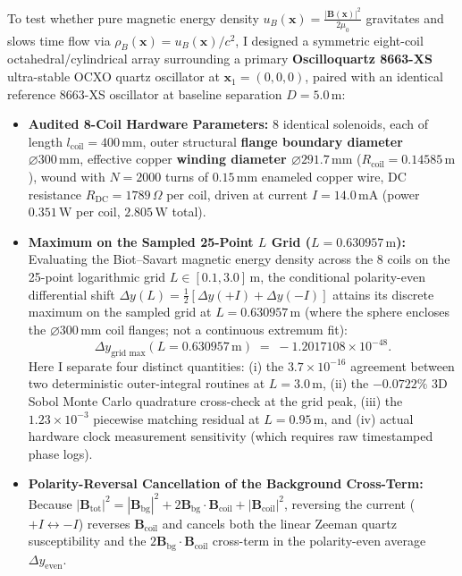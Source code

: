 \documentclass[10pt,a4paper]{article}
\begin{document}
\par
To test whether pure magnetic energy density $u_B(\mathbf{x}) = \frac{|\mathbf{B}(\mathbf{x})|^2}{2\mu_0}$ gravitates and slows time flow via $\rho_B(\mathbf{x}) = u_B(\mathbf{x})/c^2$, I designed a symmetric eight-coil octahedral/cylindrical array surrounding a primary \textbf{Oscilloquartz 8663-XS} ultra-stable OCXO quartz oscillator at $\mathbf{x}_1 = (0,0,0)$, paired with an identical reference 8663-XS oscillator at baseline separation $D = 5.0\,\text{m}$:
\begin{itemize}\setlength{\itemsep}{1pt}\setlength{\parskip}{0pt}\setlength{\topsep}{1pt}
  \item \textbf{Audited 8-Coil Hardware Parameters:} 8 identical solenoids, each of length $l_{\text{coil}} = 400\,\text{mm}$, outer structural \textbf{flange boundary diameter $\varnothing 300\,\text{mm}$}, effective copper \textbf{winding diameter $\varnothing 291.7\,\text{mm}$} ($R_{\text{coil}} = 0.14585\,\text{m}$), wound with $N = 2000$ turns of $0.15\,\text{mm}$ enameled copper wire, DC resistance $R_{\text{DC}} = 1789\,\Omega$ per coil, driven at current $I = 14.0\,\text{mA}$ (power $0.351\,\text{W}$ per coil, $2.805\,\text{W}$ total).
  \item \textbf{Maximum on the Sampled 25-Point $L$ Grid ($L = 0.630957\,\text{m}$):} Evaluating the Biot--Savart magnetic energy density across the 8 coils on the 25-point logarithmic grid $L \in [0.1, 3.0]\,\text{m}$, the conditional polarity-even differential shift $\Delta y(L) = \frac{1}{2}[\Delta y(+I) + \Delta y(-I)]$ attains its discrete maximum on the sampled grid at \textbf{$L = 0.630957\,\text{m}$} (where the sphere encloses the $\varnothing 300\,\text{mm}$ coil flanges; not a continuous extremum fit):
  \begin{equation}
    \Delta y_{\text{grid max}}(L = 0.630957\,\text{m}) \;=\; -1.2017108\times 10^{-48}.
  \end{equation}
  Here I separate four distinct quantities: (i) the $3.7\times 10^{-16}$ agreement between two deterministic outer-integral routines at $L=3.0\,\text{m}$, (ii) the $-0.0722\%$ 3D Sobol Monte Carlo quadrature cross-check at the grid peak, (iii) the $1.23\times 10^{-3}$ piecewise matching residual at $L=0.95\,\text{m}$, and (iv) actual hardware clock measurement sensitivity (which requires raw timestamped phase logs).
  \item \textbf{Polarity-Reversal Cancellation of the Background Cross-Term:} Because $|\mathbf{B}_{\text{tot}}|^2 = |\mathbf{B}_{\text{bg}}|^2 + 2\mathbf{B}_{\text{bg}}\cdot\mathbf{B}_{\text{coil}} + |\mathbf{B}_{\text{coil}}|^2$, reversing the current ($+I \leftrightarrow -I$) reverses $\mathbf{B}_{\text{coil}}$ and cancels both the linear Zeeman quartz susceptibility and the $2\mathbf{B}_{\text{bg}}\cdot\mathbf{B}_{\text{coil}}$ cross-term in the polarity-even average $\Delta y_{\text{even}}$.
\end{itemize}
\end{document}
